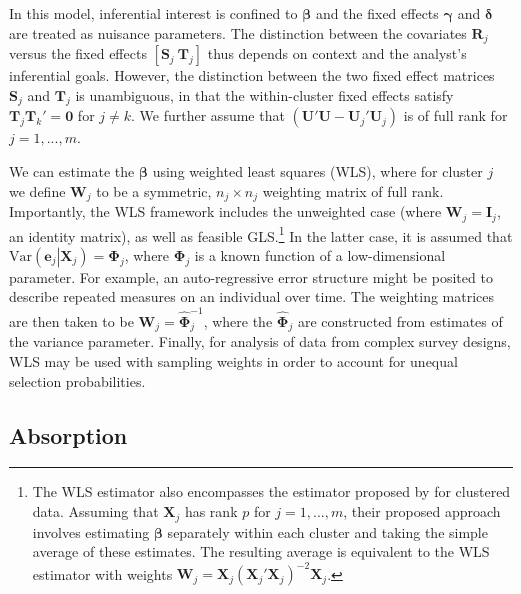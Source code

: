 \documentclass[12pt]{article}
\newcommand{\Var}{\text{Var}}
\newcommand{\bm}{\mathbf}
\newcommand{\bs}{\boldsymbol}
\begin{document}
In this model, inferential interest is confined to $\bs\beta$ and the fixed effects $\bs\gamma$ and $\bs\delta$ are treated as nuisance parameters. The distinction between the covariates $\bm{R}_j$ versus the fixed effects $\left[\bm{S}_j \ \bm{T}_j\right]$ thus depends on context and the analyst's inferential goals. However, the distinction between the two fixed effect matrices $\bm{S}_j$ and $\bm{T}_j$ is unambiguous, in that the within-cluster fixed effects satisfy $\bm{T}_j \bm{T}_k' = \bm{0}$ for $j \neq k$. We further assume that $\left(\bm{U}'\bm{U} - \bm{U}_j'\bm{U}_j\right)$ is of full rank for $j = 1,...,m$.

We can estimate the $\bs\beta$ using weighted least squares (WLS), where for cluster $j$ we define $\bm{W}_j$ to be a symmetric, $n_j \times n_j$ weighting matrix of full rank. 
Importantly, the WLS framework includes the unweighted case (where $\bm{W}_j = \bm{I}_j$, an identity matrix), as well as feasible GLS.\footnote{
The WLS estimator also encompasses the estimator proposed by \citet{Ibragimov2010tstatistic} for clustered data. 
Assuming that $\bm{X}_j$ has rank $p$ for $j = 1,...,m$, their proposed approach involves estimating $\bs\beta$ separately within each cluster and taking the simple average of these estimates. 
The resulting average is equivalent to the WLS estimator with weights $\bm{W}_j = \bm{X}_j \left(\bm{X}_j'\bm{X}_j\right)^{-2} \bm{X}_j$.} 
In the latter case, it is assumed that $\Var\left(\bm{e}_j\left|\bm{X}_j\right.\right) = \bs\Phi_j$, where $\bs\Phi_j$ is a known function of a low-dimensional parameter. 
For example, an auto-regressive error structure might be posited to describe repeated measures on an individual over time. 
The weighting matrices are then taken to be $\bm{W}_j = \hat{\bs\Phi}_j^{-1}$, where the $\hat{\bs\Phi}_j$ are constructed from estimates of the variance parameter.
Finally, for analysis of data from complex survey designs, WLS may be used with sampling weights in order to account for unequal selection probabilities.

\subsection{Absorption}
\end{document}
